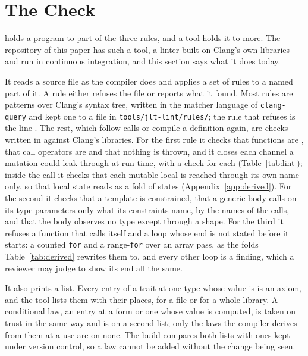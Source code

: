 \section{The Check}
\label{sec:check}

\Cpp{} holds a program to part of the three rules, and a tool holds it to more.
The repository of this paper has such a tool, a linter built on Clang's own libraries and run in continuous integration, and this section says what it does today.

It reads a source file as the compiler does and applies a set of rules to a named part of it.
A rule either refuses the file or reports what it found.
Most rules are patterns over Clang's syntax tree, written in the matcher language of \texttt{clang-query} and kept one to a file in \texttt{tools/jlt-lint/rules/}; the rule that refuses  is the line
.
The rest, which follow calls or compile a definition again, are checks written in \Cpp{} against Clang's libraries.
For the first rule it checks that functions are , that call operators are  and that nothing is thrown, and it closes each channel a mutation could leak through at run time, with a check for each (Table~\ref{tab:lint}); inside the call it checks that each mutable local is reached through its own name only, so that local state reads as a fold of states (Appendix~\ref{app:derived}).
For the second it checks that a template is constrained, that a generic body calls on its type parameters only what its constraints name, by the names of the calls, and that the body observes no type except through a shape.
For the third it refuses a function that calls itself and a loop whose end is not stated before it starts: a counted \texttt{for} and a range-\texttt{for} over an array pass, as the folds Table~\ref{tab:derived} rewrites them to, and every other loop is a finding, which a reviewer may judge to show its end all the same.

It also prints a list.
Every entry of a trait at one type whose value is  is an axiom, and the tool lists them with their places, for a file or for a whole library.
A conditional law, an entry at a form or one whose value is computed, is taken on trust in the same way and is on a second list; only the laws the compiler derives from them at a use are on none.
The build compares both lists with ones kept under version control, so a law cannot be added without the change being seen.

